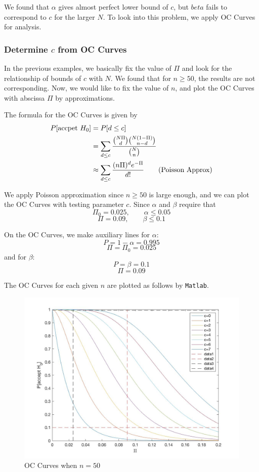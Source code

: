 \documentclass[a4paper]{article}
\begin{document}
We found that $\alpha$ gives almost perfect lower bound of $c$, but $beta$ fails to correspond to $c$ for the larger $N$. To look into this problem, we apply OC Curves for analysis.
\subsubsection{Determine $c$ from OC Curves}
In the previous examples, we basically fix the value of $\Pi$ and look for the relationship of bounds of $c$ with $N$. We found that for $n \geq 50$, the results are not corresponding. Now, we would like to fix the value of $n$, and plot the OC Curves with abscissa $\Pi$ by approximations.

The formula for the OC Curves is given by
\begin{align*}
P[\text{accpet }H_0]
&= P[d\leq c]\\
&= \sum_{d\leq c} \displaystyle\frac{\tbinom{N\Pi}{d}\tbinom{N(1-\Pi)}{n-d}}{\tbinom{N}{n}}\\
&\approx \sum_{d\leq c} \frac{(n\Pi)^de^{-\Pi}}{d!} \qquad (\text{Poisson Approx})
\end{align*}

We apply Poisson approximation since $n\geq 50$ is large enough, and we can plot the OC Curves with testing parameter $c$. Since $\alpha$ and $\beta$ require that
$$\Pi_0=0.025, \qquad \alpha\leq 0.05$$
$$\Pi=0.09, \qquad \beta\leq 0.1$$

On the OC Curves, we make auxiliary lines for $\alpha$:
$$P = 1-\alpha = 0.995$$
$$\Pi = \Pi_0 = 0.025$$
and for $\beta$:
$$P = \beta = 0.1$$
$$\Pi = 0.09$$

The OC Curves for each given $n$ are plotted as follows by \texttt{Matlab}.

\newpage

\begin{figure}[!htbp] 
\centering 
\includegraphics[width=0.7\linewidth]{n=50.jpg}  
\caption{OC Curves when $n = 50$} 
\end{figure}
\end{document}
